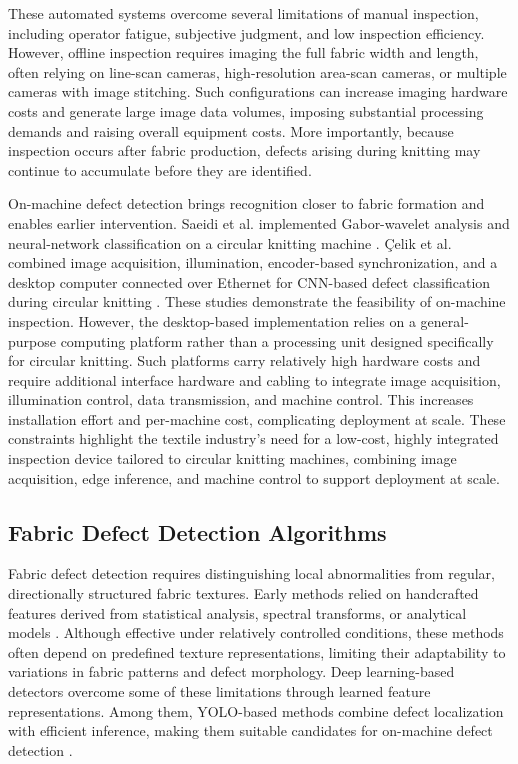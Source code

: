 \documentclass[a4paper,fleqn]{cas-dc}
\begin{document}
These automated systems overcome several limitations of manual inspection, including operator fatigue, subjective judgment, and low inspection efficiency. However, offline inspection requires imaging the full fabric width and length, often relying on line-scan cameras, high-resolution area-scan cameras, or multiple cameras with image stitching. Such configurations can increase imaging hardware costs and generate large image data volumes, imposing substantial processing demands and raising overall equipment costs. More importantly, because inspection occurs after fabric production, defects arising during knitting may continue to accumulate before they are identified.

On-machine defect detection brings recognition closer to fabric formation and enables earlier intervention. Saeidi et al. implemented Gabor-wavelet analysis and neural-network classification on a circular knitting machine \cite{saeidi2005vision}. \c{C}elik et al. combined image acquisition, illumination, encoder-based synchronization, and a desktop computer connected over Ethernet for CNN-based defect classification during circular knitting \cite{celik2022circular}. These studies demonstrate the feasibility of on-machine inspection. However, the desktop-based implementation relies on a general-purpose computing platform rather than a processing unit designed specifically for circular knitting. Such platforms carry relatively high hardware costs and require additional interface hardware and cabling to integrate image acquisition, illumination control, data transmission, and machine control. This increases installation effort and per-machine cost, complicating deployment at scale. These constraints highlight the textile industry's need for a low-cost, highly integrated inspection device tailored to circular knitting machines, combining image acquisition, edge inference, and machine control to support deployment at scale.

\subsection{Fabric Defect Detection Algorithms}
Fabric defect detection requires distinguishing local abnormalities from regular, directionally structured fabric textures. Early methods relied on handcrafted features derived from statistical analysis, spectral transforms, or analytical models \cite{kumar2008survey,ngan2011review}. Although effective under relatively controlled conditions, these methods often depend on predefined texture representations, limiting their adaptability to variations in fabric patterns and defect morphology. Deep learning-based detectors overcome some of these limitations through learned feature representations. Among them, YOLO-based methods combine defect localization with efficient inference, making them suitable candidates for on-machine defect detection \cite{redmon2016yolo}.
\end{document}
